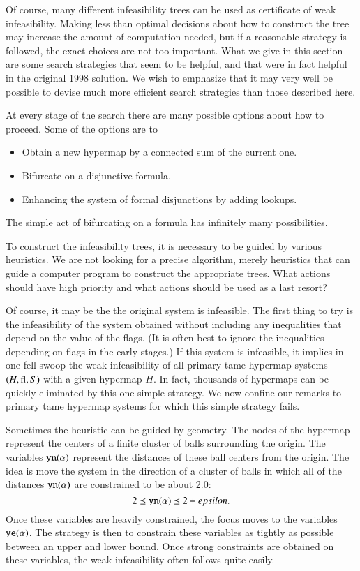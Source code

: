 Of course, many different infeasibility trees can be used as
certificate of weak infeasibility.  Making less than optimal
decisions about how to construct the tree may increase the amount
of computation needed, but if a reasonable strategy is followed,
the exact choices are not too important.  What we give in this
section are some search strategies that seem to be helpful, and
that were in fact helpful in the original 1998 solution.
  We wish to emphasize that it may very well be
possible to devise much more efficient search strategies than
those described here.

At every stage of the search there are many possible options about
how to proceed.  Some of the options are to
    \begin{itemize}
    \item Obtain a new hypermap by a connected sum of the current one.
    \item Bifurcate on a disjunctive formula.
    \item Enhancing the system of formal disjunctions by adding
    lookups.
    \end{itemize}
The simple act of bifurcating on a formula has infinitely many
possibilities.

To construct the infeasibility trees, it is necessary to be guided
by various heuristics.  We are not looking for a precise
algorithm, merely heuristics that can guide a computer program to
construct the appropriate trees. What actions should have high
priority and what actions should be used as a last resort?



Of course, it may be the the original system is infeasible.  The
first thing to try is the infeasibility of the system obtained
without including any inequalities that depend on the value of the
flags.  (It is often best to ignore the inequalities depending on
flags in the early stages.)  If this system is infeasible, it
implies in one fell swoop the weak infeasibility of all primary
tame hypermap systems $(H,{\operatorname{fl}},S)$ with a given hypermap $H$.
In fact, thousands of hypermaps can be quickly eliminated by this
one simple strategy.  We now confine our remarks to primary tame
hypermap systems for which this simple strategy fails.

Sometimes the heuristic can be guided by geometry.  The nodes of
the hypermap represent the centers of a finite cluster of balls
surrounding the origin.
 The variables ${\operatorname{{\texttt{yn}}}}(\alpha)$ represent the distances of
 these ball centers from the origin.  The idea is move the
 system in the direction of a cluster of balls in which all of
 the distances ${\operatorname{{\texttt{yn}}}}(\alpha)$ are constrained to be about
 2.0:
    $$2 \preceq {\operatorname{{\texttt{yn}}}}(\alpha) \preceq 2+epsilon.$$
 Once these variables are heavily constrained, the focus moves to the
 variables ${\operatorname{{\texttt{ye}}}}(\alpha)$.  The strategy is then to constrain
 these variables as tightly as possible between an upper and lower
 bound.  Once strong constraints are obtained on these variables,
 the weak infeasibility often follows quite easily.

